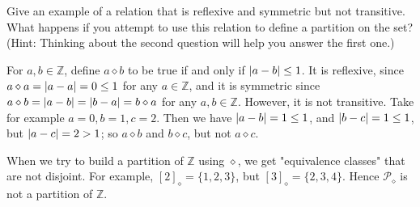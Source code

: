 \begin{problem}
  Give an example of a relation that is reflexive and symmetric but not
  transitive. What happens if you attempt to use this relation to define a
  partition on the set? (Hint: Thinking about the second question will help
  you answer the first one.)
\end{problem}
\begin{solution}
  For $a,b\in \mathbb{Z}$, define $a\diamond b$ to be true if and only if
  $\left|a-b\right| \leq 1$. It is reflexive, since $a\diamond a = \left|a-a\right| = 0 \leq
  1$ for any $a\in \mathbb{Z}$, and it is symmetric since $a\diamond b =
  \left|a-b\right| = \left|b-a\right| = b\diamond a$ for any $a,b\in \mathbb{Z}$. However,
  it is not transitive. Take for example $a=0, b=1, c=2$.  Then we have
  $\left|a-b\right| = 1\leq 1$, and $\left|b-c\right| = 1\leq 1$, but $\left|a-c\right| = 2 > 1$;
  so $a\diamond b$ and $b\diamond c$, but not $a\diamond c$.

  When we try to build a partition of $\mathbb{Z}$ using $\diamond$, we get
  "equivalence classes" that are not disjoint. For example, $[2]_{\diamond} =
  \{1,2,3\}$, but $[3]_{\diamond} = \{2,3,4\}$. Hence $\mathscr{P}_{\diamond}$
  is not a partition of $\mathbb{Z}$.
\end{solution}

